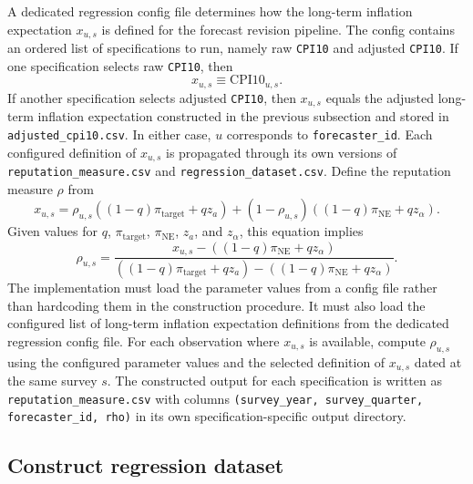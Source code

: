 \documentclass[11pt]{article}
\begin{document}
A dedicated regression config file determines how the long-term inflation
expectation $x_{u,s}$ is defined for the forecast revision pipeline. The config
contains an ordered list of specifications to run, namely raw
\texttt{CPI10} and adjusted \texttt{CPI10}. If one specification selects raw
\texttt{CPI10}, then
\begin{equation}
x_{u,s} \equiv \text{CPI10}_{u,s}.
\end{equation}
If another specification selects adjusted \texttt{CPI10}, then $x_{u,s}$
equals the adjusted long-term inflation expectation constructed in the previous
subsection and stored in \texttt{adjusted\_cpi10.csv}. In either case, $u$
corresponds to \texttt{forecaster\_id}. Each configured definition of $x_{u,s}$
is propagated through its own versions of \texttt{reputation\_measure.csv} and
\texttt{regression\_dataset.csv}. Define the reputation measure $\rho$ from
\begin{equation}
x_{u,s} = \rho_{u,s}\left((1-q)\pi_{\text{target}} + q z_a\right)
 + (1-\rho_{u,s})\left((1-q)\pi_{\text{NE}} + q z_{\alpha}\right).
\end{equation}
Given values for $q$, $\pi_{\text{target}}$, $\pi_{\text{NE}}$, $z_a$, and
$z_{\alpha}$, this equation implies
\begin{equation}
\rho_{u,s} =
\frac{x_{u,s} - \left((1-q)\pi_{\text{NE}} + q z_{\alpha}\right)}
{\left((1-q)\pi_{\text{target}} + q z_a\right)
 - \left((1-q)\pi_{\text{NE}} + q z_{\alpha}\right)}.
\end{equation}
The implementation must load the parameter values from a config file rather
than hardcoding them in the construction procedure. It must also load the
configured list of long-term inflation expectation definitions from the
dedicated regression config file. For each observation where $x_{u,s}$ is
available, compute $\rho_{u,s}$ using the configured parameter values and the
selected definition of $x_{u,s}$ dated at the same survey $s$. The constructed
output for each specification is written as
\texttt{reputation\_measure.csv} with columns
\texttt{(survey\_year, survey\_quarter, forecaster\_id, rho)} in its own
specification-specific output directory.

\subsection{Construct regression dataset}
\end{document}
